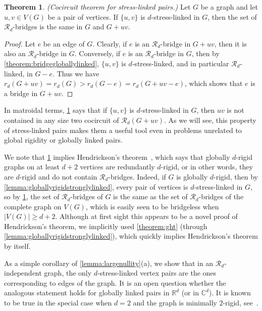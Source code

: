 \documentclass[11pt,a4paper,dvipsnames]{scrartcl}
\theoremstyle{definition}
\newtheorem{theorem}{Theorem}[section]
\newcommand{\RR}{\mathbb{R}}
\newcommand{\CC}{\mathbb{C}}
\newcommand{\globrig}[1]{globally $#1$-rigid}
\newcommand{\rig}[1]{$#1$-rigid}
\newcommand{\strongly}[1]{${#1}$-stress-linked}
\begin{document}
\begin{theorem}\label{corollary:bridges} \emph{(Cocircuit theorem for stress-linked pairs.)} \newline
    Let $G$ be a graph and let $u,v \in V(G)$ be a pair of vertices. If $\{u,v\}$ is \strongly{d} in $G$, then the set of $\mathcal{R}_d$-bridges is the same in $G$ and $G+uv$. 
\end{theorem}
\begin{proof}
    Let $e$ be an edge of $G$. Clearly, if $e$ is an $\mathcal{R}_d$-bridge in $G+uv$, then it is also an $\mathcal{R}_d$-bridge in $G$. Conversely, if $e$ is an $\mathcal{R}_d$-bridge in $G$, then by \cref{theorem:bridgegloballylinked}, $\{u,v\}$ is \strongly{d}, and in particular $\mathcal{R}_d$-linked, in $G-e$. Thus we have $r_d(G+uv) = r_d(G) > r_d(G-e) = r_d(G + uv - e)$, which shows that $e$ is a bridge in $G+uv$.
\end{proof}

In matroidal terms, \cref{corollary:bridges} says that if $\{u,v\}$ is \strongly{d} in $G$, then $uv$ is not contained in any size two cocircuit of $\mathcal{R}_d(G+uv)$. As we will see, this property of stress-linked pairs makes them a useful tool even in problems unrelated to global rigidity or globally linked pairs.

We note that \cref{corollary:bridges} implies Hendrickson's theorem~\cite{hendrickson_1992}, which says that \globrig{d} graphs on at least $d+2$ vertices are redundantly \rig{d}, or in other words, they are \rig{d} and do not contain $\mathcal{R}_d$-bridges. Indeed, if $G$ is \globrig{d}, then by \cref{lemma:globallyrigidstronglylinked}, every pair of vertices is \strongly{d} in $G$, so by \cref{corollary:bridges}, the set of $\mathcal{R}_d$-bridges of $G$ is the same as the set of $\mathcal{R}_d$-bridges of the complete graph on $V(G)$, which is easily seen to be bridgeless when $|V(G)| \geq d+2$. Although at first sight this appears to be a novel proof of Hendrickson's theorem, we implicitly used \cref{theorem:ght} (through \cref{lemma:globallyrigidstronglylinked}), which quickly implies Hendrickson's theorem by itself.



As a simple corollary of \cref{lemma:largenullity}(a), we show that in an $\mathcal{R}_d$-independent graph, the only \strongly{d} vertex pairs are the ones corresponding to edges of the graph. It is an open question whether the analogous statement holds for globally linked pairs in $\RR^d$ (or in $\CC^d$). It is known to be true in the special case when $d=2$ and the graph is minimally \rig{2}, see~\cite[Corollary 2]{jackson.etal_2014}.
\end{document}
